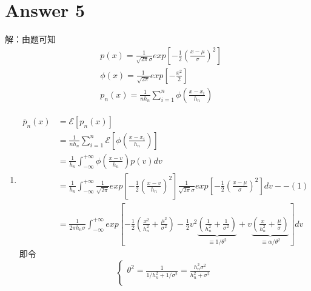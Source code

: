 \documentclass[a4paper,11pt,onecolumn,oneside,UTF8]{article}
\begin{document}
\section*{Answer 5}
解：由题可知
$$
    \begin{aligned}
         & p\left(x\right) = \frac{1}{\sqrt{2\pi}\sigma}exp\left[-\frac{1}{2}\left(\frac{x-\mu}{\sigma}\right)^2\right] \\
         & \phi\left(x\right) = \frac{1}{\sqrt{2\pi}}exp\left[-\frac{x^2}{2}\right]                                     \\
         & p_n\left(x\right) = \frac{1}{nh_n}\sum\limits_{i=1}^n\phi\left(\frac{x-x_i}{h_n}\right)
    \end{aligned}
$$
\begin{enumerate}
    \item
          $$
              \begin{aligned}
                  \bar p_n\left(x\right) & = \mathcal{E}\left[p_n\left(x\right)\right]                      \\
                                         & = \frac{1}{nh_n}\sum\limits_{i=1}^n\mathcal{E}
                  \left[\phi\left(\frac{x-x_i}{h_n}\right)\right]                                           \\
                                         & = \frac{1}{h_n}\int_{-\infty}^{+\infty}\phi\left(
                  \frac{x-v}{h_n}\right)p\left(v\right)dv                                                   \\
                                         & = \frac{1}{h_n}\int_{-\infty}^{+\infty} \frac{1}{
                      \sqrt{2\pi}}exp\left[-\frac{1}{2}\left(\frac{x-v}{h_n}\right)^2\right]\frac{1}
                  {\sqrt{2\pi}\sigma}exp\left[-\frac{1}{2}\left(\frac{x-\mu}{\sigma}\right)^2\right]dv--(1) \\
                                         & = \frac{1}{2\pi h_n\sigma}\int_{-\infty}^{+\infty}exp
                  \left[-\frac{1}{2}\left(\frac{x^2}{h_n^2}+\frac{\mu^2}{\sigma^2}\right)
                      -\frac{1}{2}v^2\underbrace{\left(\frac{1}{h_n^2}+\frac{1}{\sigma^2}\right)}
                      _{\equiv 1/\theta^2}+v\underbrace{\left(\frac{x}{h_n^2}+\frac{\mu}{\sigma}
                          \right)}_{\equiv \alpha/\theta^2}\right]dv
              \end{aligned}
          $$
          即令
          $$
              \begin{cases}
                  \theta^2 = \frac{1}{1/h_n^2+1/\sigma^2} = \frac{h_n^2\sigma^2}{h_n^2+\sigma^2} \\

\end{cases}$$
\end{enumerate}
\end{document}
